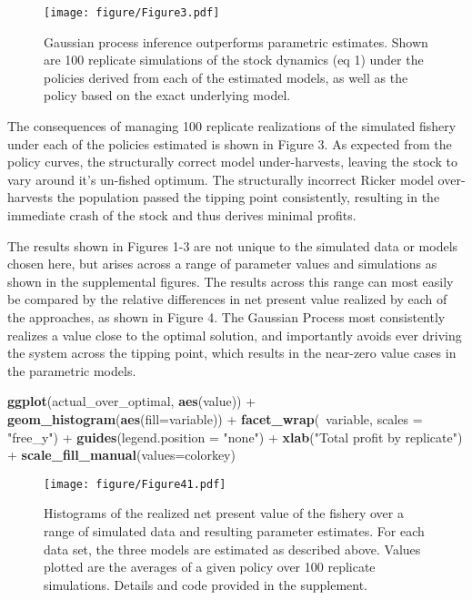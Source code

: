 \documentclass[author-year, review]{elsarticle} %
\makeatletter
\newenvironment{Shaded}{}{}
\newcommand{\KeywordTok}[1]{\textcolor[rgb]{0.00,0.44,0.13}{\textbf{{#1}}}}
\newcommand{\DataTypeTok}[1]{\textcolor[rgb]{0.56,0.13,0.00}{{#1}}}
\newcommand{\StringTok}[1]{\textcolor[rgb]{0.25,0.44,0.63}{{#1}}}
\newcommand{\NormalTok}[1]{{#1}}
\def\maxwidth{\ifdim\Gin@nat@width>\linewidth\linewidth
\else\Gin@nat@width\fi}
\let\Oldincludegraphics\includegraphics
\renewcommand{\includegraphics}[1]{\Oldincludegraphics[width=\maxwidth]{#1}}
\makeatother
\begin{document}
\begin{figure}[htbp]
\centering
\texttt{[image: figure/Figure3.pdf]}
\caption{Gaussian process inference outperforms parametric estimates.
Shown are 100 replicate simulations of the stock dynamics (eq 1) under
the policies derived from each of the estimated models, as well as the
policy based on the exact underlying model.}
\end{figure}

The consequences of managing 100 replicate realizations of the simulated
fishery under each of the policies estimated is shown in Figure 3. As
expected from the policy curves, the structurally correct model
under-harvests, leaving the stock to vary around it's un-fished optimum.
The structurally incorrect Ricker model over-harvests the population
passed the tipping point consistently, resulting in the immediate crash
of the stock and thus derives minimal profits.

The results shown in Figures 1-3 are not unique to the simulated data or
models chosen here, but arises across a range of parameter values and
simulations as shown in the supplemental figures. The results across
this range can most easily be compared by the relative differences in
net present value realized by each of the approaches, as shown in Figure
4. The Gaussian Process most consistently realizes a value close to the
optimal solution, and importantly avoids ever driving the system across
the tipping point, which results in the near-zero value cases in the
parametric models.

\begin{Shaded}
\begin{Highlighting}[]
\KeywordTok{ggplot}\NormalTok{(actual_over_optimal, }\KeywordTok{aes}\NormalTok{(value)) + }\KeywordTok{geom_histogram}\NormalTok{(}\KeywordTok{aes}\NormalTok{(}\DataTypeTok{fill=}\NormalTok{variable)) + }
  \KeywordTok{facet_wrap}\NormalTok{(~variable, }\DataTypeTok{scales =} \StringTok{"free_y"}\NormalTok{)  + }\KeywordTok{guides}\NormalTok{(}\DataTypeTok{legend.position =} \StringTok{"none"}\NormalTok{) +}
  \KeywordTok{xlab}\NormalTok{(}\StringTok{"Total profit by replicate"}\NormalTok{) + }\KeywordTok{scale_fill_manual}\NormalTok{(}\DataTypeTok{values=}\NormalTok{colorkey)}
\end{Highlighting}
\end{Shaded}

\begin{figure}[htbp]
\centering
\texttt{[image: figure/Figure41.pdf]}
\caption{Histograms of the realized net present value of the fishery
over a range of simulated data and resulting parameter estimates. For
each data set, the three models are estimated as described above. Values
plotted are the averages of a given policy over 100 replicate
simulations. Details and code provided in the supplement.}
\end{figure}
\end{document}
